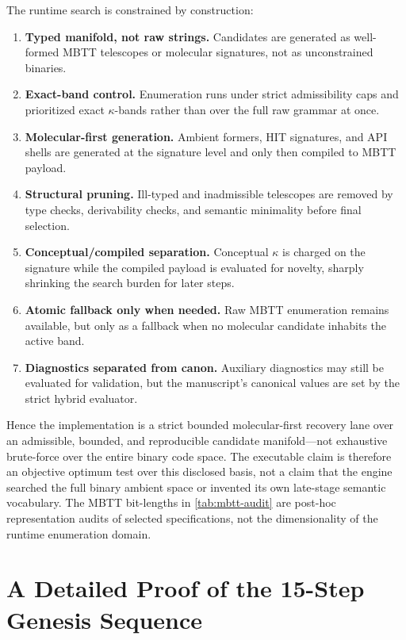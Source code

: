 \documentclass[11pt,a4paper]{article}
\theoremstyle{plain}
\theoremstyle{definition}
\theoremstyle{remark}
\begin{document}
The runtime search is constrained by construction:
\begin{enumerate}[nosep]
    \item \textbf{Typed manifold, not raw strings.} Candidates are generated as well-formed MBTT telescopes or molecular signatures, not as unconstrained binaries.
    \item \textbf{Exact-band control.} Enumeration runs under strict admissibility caps and prioritized exact $\kappa$-bands rather than over the full raw grammar at once.
    \item \textbf{Molecular-first generation.} Ambient formers, HIT signatures, and API shells are generated at the signature level and only then compiled to MBTT payload.
    \item \textbf{Structural pruning.} Ill-typed and inadmissible telescopes are removed by type checks, derivability checks, and semantic minimality before final selection.
    \item \textbf{Conceptual/compiled separation.} Conceptual $\kappa$ is charged on the signature while the compiled payload is evaluated for novelty, sharply shrinking the search burden for later steps.
    \item \textbf{Atomic fallback only when needed.} Raw MBTT enumeration remains available, but only as a fallback when no molecular candidate inhabits the active band.
    \item \textbf{Diagnostics separated from canon.} Auxiliary diagnostics may still be evaluated for validation, but the manuscript's canonical values are set by the strict hybrid evaluator.
\end{enumerate}

Hence the implementation is a strict bounded molecular-first recovery lane over an admissible, bounded, and reproducible candidate manifold---not exhaustive brute-force over the entire binary code space.
The executable claim is therefore an objective optimum test over this disclosed basis, not a claim that the engine searched the full binary ambient space or invented its own late-stage semantic vocabulary.
The MBTT bit-lengths in \cref{tab:mbtt-audit} are post-hoc representation audits of selected specifications, not the dimensionality of the runtime enumeration domain.

\section{A Detailed Proof of the 15-Step Genesis Sequence}
\label{sec:genesis-sequence-proof}
\end{document}

